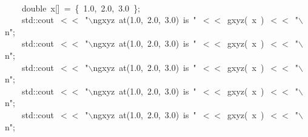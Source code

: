 \documentclass[9pt,onside]{article}
\newcommand{\hlstd}[1]{\textcolor[rgb]{0.2,0,0.4}{#1}}
\newcommand{\hlnum}[1]{\textcolor[rgb]{0.2,0.73,0.02}{#1}}
\newcommand{\hlesc}[1]{\textcolor[rgb]{0.65,0.09,0.38}{#1}}
\newcommand{\hlstr}[1]{\textcolor[rgb]{0.09,0.38,0.65}{#1}}
\newcommand{\hlopt}[1]{\textcolor[rgb]{0.33,0.33,0.33}{#1}}
\newcommand{\hlkwb}[1]{\textcolor[rgb]{0.96,0.55,0.14}{#1}}
\newcommand{\hlkwd}[1]{\textcolor[rgb]{0.82,0.11,0.93}{#1}}
\begin{document}
{\hlstd{\hspace*{\fill}\\
}\hlstd{\ \ \ \ }\hlstd{}\hlkwb{double\ }\hlstd{x}\hlopt{{[}{]}\ =\ \{\ }\hlstd{}\hlnum{1.0}\hlstd{}\hlopt{,\ }\hlstd{}\hlnum{2.0}\hlstd{}\hlopt{,\ }\hlstd{}\hlnum{3.0\ }\hlstd{}\hlopt{\};}\hspace*{\fill}\\
\hlstd{}\hlstd{\ \ \ \ }\hlstd{std}\hlopt{::}\hlstd{cout\ }\hlopt{$<$$<$\ }\hlstd{}\hlstr{"}\hlesc{$\backslash$n}\hlstr{gxyz\ at(1.0,\ 2.0,\ 3.0)\ is\ "}\hlstd{\ }\hlopt{$<$$<$\ }\hlstd{}\hlkwd{gxyz}\hlstd{}\hlopt{(\ }\hlstd{x\ }\hlopt{)\ $<$$<$\ }\hlstd{}\hlstr{"}\hlesc{$\backslash$n}\hlstr{"}\hlstd{}\hlopt{;}\hspace*{\fill}\\
\hlstd{}\hlstd{\ \ \ \ }\hlstd{std}\hlopt{::}\hlstd{cout\ }\hlopt{$<$$<$\ }\hlstd{}\hlstr{"}\hlesc{$\backslash$n}\hlstr{gxyz\ at(1.0,\ 2.0,\ 3.0)\ is\ "}\hlstd{\ }\hlopt{$<$$<$\ }\hlstd{}\hlkwd{gxyz}\hlstd{}\hlopt{(\ }\hlstd{x\ }\hlopt{)\ $<$$<$\ }\hlstd{}\hlstr{"}\hlesc{$\backslash$n}\hlstr{"}\hlstd{}\hlopt{;}\hspace*{\fill}\\
\hlstd{}\hlstd{\ \ \ \ }\hlstd{std}\hlopt{::}\hlstd{cout\ }\hlopt{$<$$<$\ }\hlstd{}\hlstr{"}\hlesc{$\backslash$n}\hlstr{gxyz\ at(1.0,\ 2.0,\ 3.0)\ is\ "}\hlstd{\ }\hlopt{$<$$<$\ }\hlstd{}\hlkwd{gxyz}\hlstd{}\hlopt{(\ }\hlstd{x\ }\hlopt{)\ $<$$<$\ }\hlstd{}\hlstr{"}\hlesc{$\backslash$n}\hlstr{"}\hlstd{}\hlopt{;}\hspace*{\fill}\\
\hlstd{}\hlstd{\ \ \ \ }\hlstd{std}\hlopt{::}\hlstd{cout\ }\hlopt{$<$$<$\ }\hlstd{}\hlstr{"}\hlesc{$\backslash$n}\hlstr{gxyz\ at(1.0,\ 2.0,\ 3.0)\ is\ "}\hlstd{\ }\hlopt{$<$$<$\ }\hlstd{}\hlkwd{gxyz}\hlstd{}\hlopt{(\ }\hlstd{x\ }\hlopt{)\ $<$$<$\ }\hlstd{}\hlstr{"}\hlesc{$\backslash$n}\hlstr{"}\hlstd{}\hlopt{;}\hspace*{\fill}\\
\hlstd{}\hlstd{\ \ \ \ }\hlstd{std}\hlopt{::}\hlstd{cout\ }\hlopt{$<$$<$\ }\hlstd{}\hlstr{"}\hlesc{$\backslash$n}\hlstr{gxyz\ at(1.0,\ 2.0,\ 3.0)\ is\ "}\hlstd{\ }\hlopt{$<$$<$\ }\hlstd{}\hlkwd{gxyz}\hlstd{}\hlopt{(\ }\hlstd{x\ }\hlopt{)\ $<$$<$\ }\hlstd{}\hlstr{"}\hlesc{$\backslash$n}\hlstr{"}\hlstd{}\hlopt{;}\hspace*{\fill}\\
}
\end{document}
